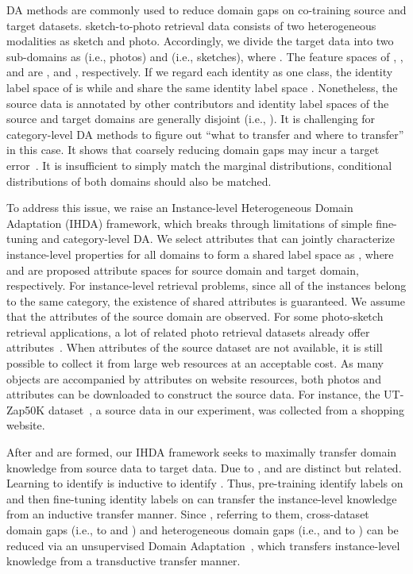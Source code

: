 \documentclass[journal]{IEEEtran}
\begin{document}
DA methods are commonly used to reduce domain gaps on co-training source and target datasets. sketch-to-photo retrieval data consists of two heterogeneous modalities as sketch and photo. Accordingly, we divide the target data into two sub-domains as  (i.e., photos) and  (i.e., sketches), where . The feature spaces of , , and  are ,  and , respectively. If we regard each identity as one class, the identity label space of  is  while  and  share the same identity label space . Nonetheless, the source data is annotated by other contributors and identity label spaces of the source and target domains are generally disjoint (i.e., ). It is challenging for category-level DA methods to figure out ``what to transfer and where to transfer'' in this case. It shows that coarsely reducing domain gaps may incur a target error~\cite{saito2017asymmetric}. It is insufficient to simply match the marginal distributions, conditional distributions of both domains should also be matched.

To address this issue, we raise an Instance-level Heterogeneous Domain Adaptation (IHDA) framework, which breaks through limitations of simple fine-tuning and category-level DA. We select attributes that can jointly characterize instance-level properties for all domains to form a shared label space as , where  and  are proposed attribute spaces for source domain and target domain, respectively. For instance-level retrieval problems, since all of the instances belong to the same category, the existence of shared attributes is guaranteed. We assume that the attributes of the source domain are observed. For some photo-sketch retrieval applications, a lot of related photo retrieval datasets already offer attributes~\cite{liu2015faceattributes,lin2019improving}. When attributes of the source dataset are not available, it is still possible to collect it from large web resources at an acceptable cost. As many objects are accompanied by attributes on website resources, both photos and attributes can be downloaded to construct the source data. For instance, the UT-Zap50K dataset~\cite{semjitter}, a source data in our experiment, was collected from a shopping website.

After  and  are formed, our IHDA framework seeks to maximally transfer domain knowledge from source data to target data. Due to ,  and   are distinct but related. Learning to identify  is inductive to identify . Thus, pre-training identify labels on  and then fine-tuning identity labels on  can transfer the instance-level knowledge from an inductive transfer manner. Since , referring to them, cross-dataset domain gaps (i.e.,  to  and ) and heterogeneous domain gaps (i.e.,  and  to ) can be reduced via an unsupervised Domain Adaptation~\cite{pei2018multi,rozantsev2018beyond,cao2018partial,zou2019consensus}, which transfers instance-level knowledge from a transductive transfer manner.
\end{document}
